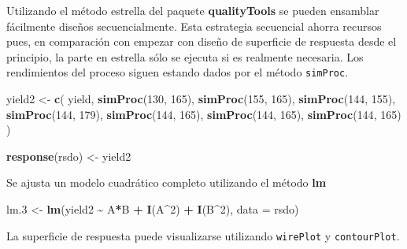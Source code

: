 \documentclass[
]{book}
\newenvironment{Shaded}{\begin{snugshade}}{\end{snugshade}}
\newcommand{\AttributeTok}[1]{\textcolor[rgb]{0.13,0.29,0.53}{#1}}
\newcommand{\DecValTok}[1]{\textcolor[rgb]{0.00,0.00,0.81}{#1}}
\newcommand{\FloatTok}[1]{\textcolor[rgb]{0.00,0.00,0.81}{#1}}
\newcommand{\FunctionTok}[1]{\textcolor[rgb]{0.13,0.29,0.53}{\textbf{#1}}}
\newcommand{\NormalTok}[1]{#1}
\newcommand{\OtherTok}[1]{\textcolor[rgb]{0.56,0.35,0.01}{#1}}
\newcommand{\SpecialCharTok}[1]{\textcolor[rgb]{0.81,0.36,0.00}{\textbf{#1}}}
\begin{document}
Utilizando el método estrella del paquete \textbf{qualityTools} se pueden ensamblar fácilmente diseños
secuencialmente. Esta estrategia secuencial ahorra recursos pues, en comparación con empezar con
diseño de superficie de respuesta desde el principio, la parte en estrella sólo se ejecuta si es realmente necesaria. Los rendimientos del proceso siguen estando dados por el método \texttt{simProc}.

\begin{Shaded}
\begin{Highlighting}[]
\NormalTok{yield2 }\OtherTok{\textless{}{-}} \FunctionTok{c}\NormalTok{(}
\NormalTok{  yield,}
  \FunctionTok{simProc}\NormalTok{(}\DecValTok{130}\NormalTok{, }\DecValTok{165}\NormalTok{),}
  \FunctionTok{simProc}\NormalTok{(}\DecValTok{155}\NormalTok{, }\DecValTok{165}\NormalTok{),}
  \FunctionTok{simProc}\NormalTok{(}\DecValTok{144}\NormalTok{, }\DecValTok{155}\NormalTok{),}
  \FunctionTok{simProc}\NormalTok{(}\DecValTok{144}\NormalTok{, }\DecValTok{179}\NormalTok{),}
  \FunctionTok{simProc}\NormalTok{(}\DecValTok{144}\NormalTok{, }\DecValTok{165}\NormalTok{),}
  \FunctionTok{simProc}\NormalTok{(}\DecValTok{144}\NormalTok{, }\DecValTok{165}\NormalTok{),}
  \FunctionTok{simProc}\NormalTok{(}\DecValTok{144}\NormalTok{, }\DecValTok{165}\NormalTok{)}
\NormalTok{)}

\FunctionTok{response}\NormalTok{(rsdo) }\OtherTok{\textless{}{-}}\NormalTok{ yield2}
\end{Highlighting}
\end{Shaded}

Se ajusta un modelo cuadrático completo utilizando el método \textbf{lm}

\begin{Shaded}
\begin{Highlighting}[]
\NormalTok{lm}\FloatTok{.3} \OtherTok{\textless{}{-}} \FunctionTok{lm}\NormalTok{(yield2 }\SpecialCharTok{\textasciitilde{}}\NormalTok{ A}\SpecialCharTok{*}\NormalTok{B }\SpecialCharTok{+} \FunctionTok{I}\NormalTok{(A}\SpecialCharTok{\^{}}\DecValTok{2}\NormalTok{) }\SpecialCharTok{+} \FunctionTok{I}\NormalTok{(B}\SpecialCharTok{\^{}}\DecValTok{2}\NormalTok{), }\AttributeTok{data =}\NormalTok{ rsdo)}
\end{Highlighting}
\end{Shaded}

La superficie de respuesta puede visualizarse utilizando \texttt{wirePlot} y \texttt{contourPlot}.
\end{document}
